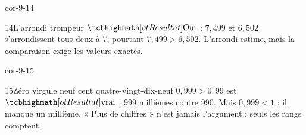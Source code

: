\begin{blocLivre}{cor-9-14}\begin{corrige}{14}{L’arrondi trompeur}
$\res{\text{Oui}}$ : $7{,}499$ et $6{,}502$ s’arrondissent tous deux à 7, pourtant $7{,}499>6{,}502$. L’arrondi estime, mais la comparaison exige les valeurs exactes.
\end{corrige}\end{blocLivre}
\begin{blocLivre}{cor-9-15}\begin{corrige}{15}{Zéro virgule neuf cent quatre-vingt-dix-neuf}
$0{,}999>0{,}99$ est $\res{\text{vrai}}$ : 999 millièmes contre 990. Mais $0{,}999<1$ : il manque un millième. « Plus de chiffres » n’est jamais l’argument : seuls les rangs comptent.
\end{corrige}\end{blocLivre}
